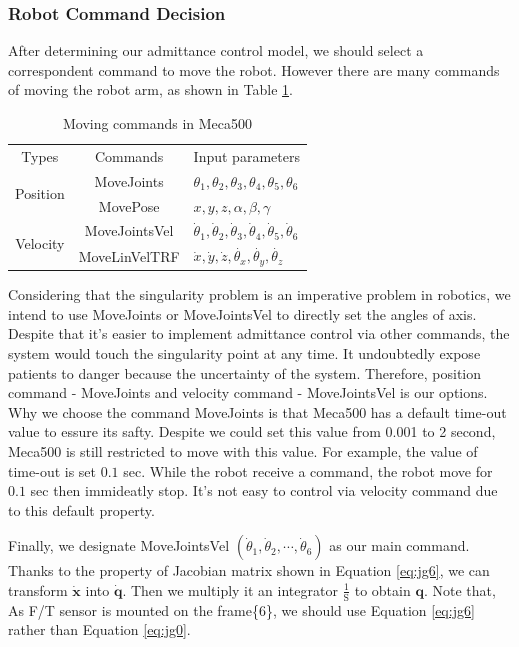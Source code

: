 \subsubsection{Robot Command Decision}
After determining our admittance control model, we should select a correspondent command to move the robot. However there are many commands of moving the robot arm, as shown in Table \ref{tab:commands}.
\begin{table}[htbp]
\centering
\caption{Moving commands in Meca500}
\label{tab:commands}
\begin{tabular}{c|c|l} 
\hline \hline
Types										&Commands			&Input parameters\\
\cline{1-3}
\multirow{2}{*}{Position}					&MoveJoints			&\noindent $\theta _1, \theta _2 ,\theta _3 ,\theta _4 ,\theta _5 , \theta _6 $\\\cline{2-3}
											&MovePose			&\noindent$x,y,z,\alpha ,\beta ,\gamma $\\
\cline{1-3}
\multirow{2}{*}{Velocity}					&MoveJointsVel		&$\dot{\theta}_1, \dot{\theta}_2, \dot{\theta}_3,\dot{\theta}_4, \dot{\theta}_5 , \dot{\theta}_6 $\\\cline{2-3}
											&MoveLinVelTRF		&$\dot{x},\dot{y},\dot{z},\dot{\theta _x},\dot{\theta _y},\dot{\theta _z}$\\
\hline \hline
\end{tabular}
\end{table}
\par
Considering that the singularity problem is an imperative problem in robotics, we intend to use MoveJoints or MoveJointsVel to directly set the angles of axis. Despite that it's easier to implement admittance control via other commands, the system would touch the singularity point at any time. It undoubtedly expose patients to danger because the uncertainty of the system. Therefore, position command - MoveJoints and velocity command - MoveJointsVel is our options. Why we choose the command MoveJoints  is that Meca500 has a default time-out value to essure its safty. Despite we could set this value from 0.001 to 2 second, Meca500 is still restricted to move with this value. For example, the value of time-out is set $0.1$ sec. While the robot receive a command, the robot move for $0.1$ sec then immideatly stop. It's not easy to control via velocity command due to this default property.
\par
Finally, we designate MoveJointsVel $\left(\dot{\theta}_1, \dot{\theta}_2,\cdots , \dot{\theta}_6 \right)$ as our main command. Thanks to the property of Jacobian matrix shown in Equation \ref{eq:jg6}, we can transform $\boldsymbol{\dot{x}}$ into $\boldsymbol{\dot{q}}$. Then we multiply it an integrator $\frac{1}{\mathrm{S}}$
to obtain $\boldsymbol{q}$. Note that, As F/T sensor is mounted on the frame\{6\}, we should use Equation \ref{eq:jg6} rather than Equation \ref{eq:jg0}. 
